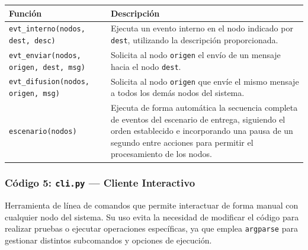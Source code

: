 \documentclass[letterpaper,11pt]{article}
\begin{document}
\begin{center}
\begin{tabular}{>{\ttfamily}l p{9cm}}
\toprule
\textbf{Función} & \textbf{Descripción} \\
\midrule
\texttt{evt\_interno(nodos, dest, desc)} &
  Ejecuta un evento interno en el nodo indicado por \texttt{dest},
  utilizando la descripción proporcionada. \\[4pt]

\texttt{evt\_enviar(nodos, origen, dest, msg)} &
  Solicita al nodo \texttt{origen} el envío de un mensaje hacia el nodo
  \texttt{dest}. \\[4pt]

\texttt{evt\_difusion(nodos, origen, msg)} &
  Solicita al nodo \texttt{origen} que envíe el mismo mensaje a todos los
  demás nodos del sistema. \\[4pt]

\texttt{escenario(nodos)} &
  Ejecuta de forma automática la secuencia completa de eventos del
  escenario de entrega, siguiendo el orden establecido e incorporando una
  pausa de un segundo entre acciones para permitir el procesamiento de los
  nodos. \\
\bottomrule
\end{tabular}
\end{center}


\subsubsection{Código 5: \texttt{cli.py} — Cliente Interactivo}
Herramienta de línea de comandos que permite interactuar de forma
manual con cualquier nodo del sistema. Su uso evita la necesidad de
modificar el código para realizar pruebas o ejecutar operaciones
específicas, ya que emplea \texttt{argparse} para gestionar distintos
subcomandos y opciones de ejecución.
\end{document}
